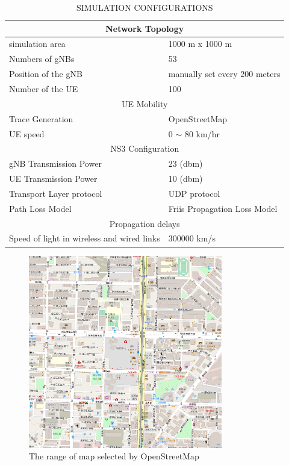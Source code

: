 \documentclass[journal]{IEEEtran}
\begin{document}
\begin{table}[t!]
\caption{SIMULATION CONFIGURATIONS}
\label{tab:setting}
\centering
\begin{tabular}{ |p{4cm}|p{4cm}|  }
    \hline
    \multicolumn{2}{|c|}{Network Topology} \\
    \hline
        simulation area & 1000 m x 1000 m \\
    \hline
        Numbers of gNBs & 53 \\
    \hline
        Position of the gNB & manually set every 200 meters \\
    \hline
        Number of the UE & 100 \\
    \hline
    \multicolumn{2}{|c|}{UE Mobility} \\
    \hline
        Trace Generation & OpenStreetMap \\
    \hline
    UE speed & 0 $\sim$ 80 km/hr \\
    \hline
    \multicolumn{2}{|c|}{NS3 Configuration} \\
    \hline
        gNB Transmission Power & 23 (dbm) \cite{5GNR} \\
    \hline
    UE Transmission Power & 10 (dbm) \\
    \hline
        Transport Layer protocol & UDP protocol \\
    \hline
    Path Loss Model & Friis Propagation Loss Model \\
    \hline
    \multicolumn{2}{|c|}{Propagation delays} \\
    \hline
        Speed of light in wireless and wired links & 300000 km/s \\
    \hline
\end{tabular}
\end{table}

\begin{figure}[h]
    \centering
    \includegraphics[width=240pt]{picture/7.png}
    \caption{The range of map selected by OpenStreetMap}
    \label{fig:OpenStreetMap}
\end{figure}
\end{document}
